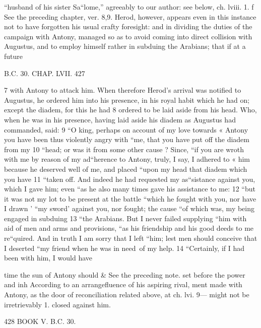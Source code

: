 “husband of his sister Sa“lome,” agreeably to our author: see below, ch. lviii. 1. 
f See the preceding chapter, ver. 8,9. Herod, however, appears even in this instance not to have forgotten his usual crafty foresight: and in dividing the duties of the campaign with Antony, managed so as to avoid coming into direct collision with Augustus, and to employ himself rather in subduing the Arabians; that if at a future 

B.C. 30. CHAP. LVII. 427 

7 with Antony to attack him. When therefore Herod’s arrival was notified to Augustus, he ordered him into his presence, in his royal habit which he had on; except the diadem, for this he had 
8 ordered to be laid aside from his head. Who, when he was in his presence, having laid aside his diadem as Augustus had commanded, said: 
9 “O king, perhaps on account of my love towards « Antony you have been thus violently angry with “me, that you have put off the diadem from my 
10 “head; or was it from some other cause ? Since, “if you are wroth with me by reason of my ad“herence to Antony, truly, I say, I adhered to « him because he deserved well of me, and placed “upon my head that diadem which you have 11 “taken off. And indeed he had requested my as“sistance against you, which I gave him; even “as he also many times gave his assistance to me: 12 “but it was not my lot to be present at the battle “which he fought with you, nor have I drawn 
' “my sword’ against you, nor fought; the cause 
“of which was, my being engaged in subduing 13 “the Arabians. But I never failed supplying “him with aid of men and arms and provisions, “as his friendship and his good deeds to me re“quired. And in truth I am sorry that I left “him; lest men should conceive that I deserted “my friend when he was in need~of my help. 14 “Certainly, if I had been with him, I would have 

time the sun of Antony should & See the preceding note. set before the power and inh According to an arrangefluence of his aspiring rival, ment made with Antony, as the door of reconciliation related above, at ch. lvi. 9— might not be irretrievably 1. 
closed against him. 

428 BOOK V. B.C. 30. 

